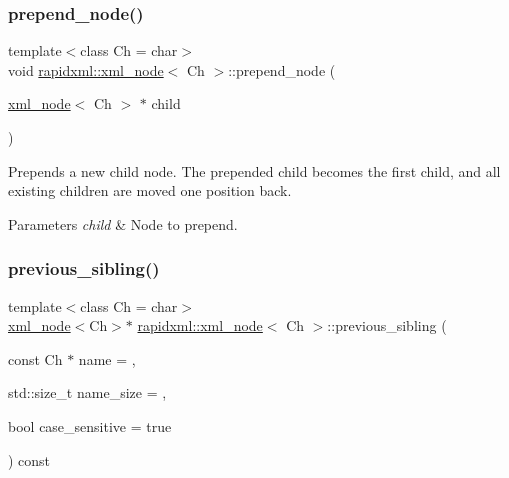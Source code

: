 \subsubsection{\texorpdfstring{prepend\+\_\+node()}{prepend\_node()}}
{\footnotesize\ttfamily template$<$class Ch = char$>$ \\
void \hyperlink{classrapidxml_1_1xml__node}{rapidxml\+::xml\+\_\+node}$<$ Ch $>$\+::prepend\+\_\+node (\begin{DoxyParamCaption}\item[{\hyperlink{classrapidxml_1_1xml__node}{xml\+\_\+node}$<$ Ch $>$ $\ast$}]{child }\end{DoxyParamCaption})\hspace{0.3cm}{\ttfamily [inline]}}

Prepends a new child node. The prepended child becomes the first child, and all existing children are moved one position back. 
\begin{DoxyParams}{Parameters}
{\em child} & Node to prepend. \\
\hline
\end{DoxyParams}
\mbox{\label{classrapidxml_1_1xml__node_aebcc42042ded78fb7020e2783f7d5426}} 
\subsubsection{\texorpdfstring{previous\+\_\+sibling()}{previous\_sibling()}}
{\footnotesize\ttfamily template$<$class Ch = char$>$ \\
\hyperlink{classrapidxml_1_1xml__node}{xml\+\_\+node}$<$Ch$>$$\ast$ \hyperlink{classrapidxml_1_1xml__node}{rapidxml\+::xml\+\_\+node}$<$ Ch $>$\+::previous\+\_\+sibling (\begin{DoxyParamCaption}\item[{const Ch $\ast$}]{name = {},  }\item[{std\+::size\+\_\+t}]{name\+\_\+size = {},  }\item[{bool}]{case\+\_\+sensitive = {\ttfamily true} }\end{DoxyParamCaption}) const\hspace{0.3cm}{\ttfamily [inline]}}

